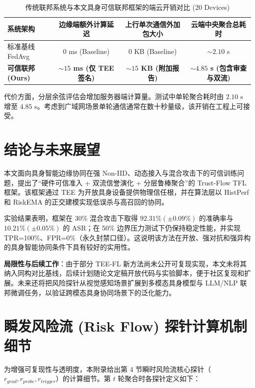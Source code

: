 \documentclass[11pt, a4paper, UTF8, fontset=fandol]{ctexart}
\begin{document}
\begin{table}[htbp]
    \centering
    \caption{传统联邦系统与本文具身可信联邦框架的端云开销对比 (20 Devices)}
    \vspace{4pt}
    \label{tab:overhead}
    \begin{tabular}{l c c c}
        \toprule
        \textbf{系统架构}        & \textbf{边缘端额外计算延迟}         & \textbf{上行单次通信外加包大小}  & \textbf{云端中央聚合总耗时}             \\
        \midrule
        标准基线 FedAvg          & 0 ms (Baseline)                     & 0 KB (Baseline)                  & $\sim 2.10$ s                           \\
        \textbf{可信联邦 (Ours)} & \textbf{$\sim 15$ ms (仅 TEE 签名)} & \textbf{$\sim 15$ KB (附加报告)} & \textbf{$\sim 4.85$ s (包含审查与双流)} \\
        \bottomrule
    \end{tabular}
\end{table}

代价方面，分层余弦评估会增加服务器端计算量。测试中单轮聚合耗时由 $2.10$ s 增至 $4.85$ s。考虑到广域网场景单轮通信通常在数十秒量级，该开销在工程上可接受。

\section{结论与未来展望}
本文面向具身智能边缘协同在强 Non-IID、动态接入与混合攻击下的可信训练问题，提出了“硬件可信准入 + 双流信誉演化 + 分层鲁棒聚合”的 Trust-Flow TFL 框架。该框架通过 TEE 为开放具身设备提供物理信任根，并在算法层以 HistPerf 和 RiskEMA 的正交建模实现低误杀与高召回的协同。

实验结果表明，框架在 30\% 混合攻击下取得 $92.31\% (\pm 0.09\%)$ 的准确率与 $10.21\% (\pm 0.05\%)$ 的 ASR；在 50\% 边界压力测试下仍保持稳定性能，并实现 TPR=100\%、FPR=0\%（永久封禁口径）。这说明该方法在开放、强对抗和强异构的具身智能协同条件下具有较好的实用性。

\textbf{局限性与后续工作}：由于部分 TEE-FL 新方法尚未公开可复现实现，本文未将其纳入同构对比基线，后续计划随论文定稿开放代码与实验脚本，便于社区复现和扩展。未来还将把风险探针从视觉感知场景扩展到多模态具身模型与 LLM/NLP 联邦微调任务，以验证跨模态具身协同场景下的泛化能力。

\appendix
\section{瞬发风险流 (Risk Flow) 探针计算机制细节}
为增强可复现性与透明度，本附录给出第 4 节瞬时风险流核心探针（$r_{grad}, r_{probe}, r_{trigger}$）的计算细节。第 $t$ 轮聚合时各探针定义如下：
\end{document}
